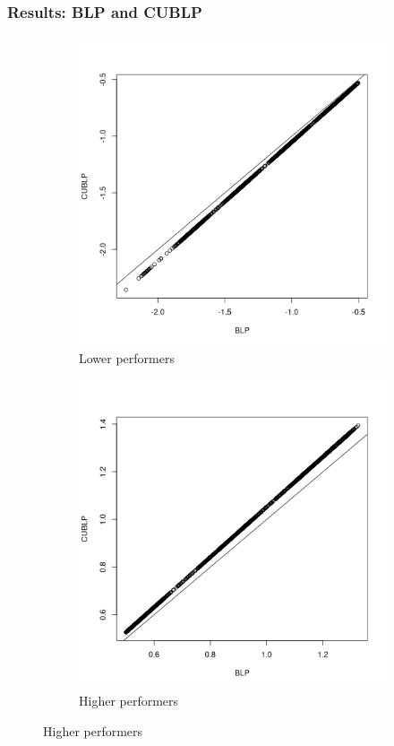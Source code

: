 \documentclass{beamer}
\begin{document}
	\begin{frame}[t]\frametitle{Results: BLP and CUBLP}
		\begin{figure}[t]
	    \centering
	    \begin{subfigure}[b]{0.45\textwidth}
	      \centering
	      \includegraphics[width=\textwidth]{Fig/lower_S.png}
	      \caption{Lower performers}
	    \end{subfigure}
	    \begin{subfigure}[b]{0.45\textwidth}
	      \centering
	      \includegraphics[width=\textwidth]{Fig/higher_S.png}
	      \caption{Higher performers}
	    \end{subfigure}
	  \end{figure}
	\end{frame}
\end{document}

